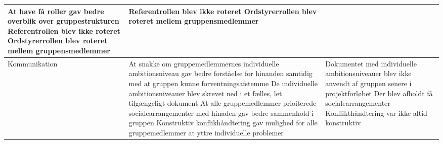 \begin{table}[h]
\begin{tabular}{|l|p{5cm}|p{5cm}||}
		       At have få roller gav bedre overblik over gruppestrukturen
		       Referentrollen blev ikke roteret                                                                                                                       \newline
			   Ordstyrerrollen blev roteret mellem gruppensmedlemmer                                                                                                  \newline
		                                                           &   Referentrollen blev ikke roteret                                                               \newline
		                                                           	   Ordstyrerrollen blev roteret mellem gruppensmedlemmer                                       \\ \hline
		\multicolumn{1}{|l|}{Kommunikation}                        &   
		       At snakke om gruppemedlemmernes individuelle ambitionsniveau gav bedre forståelse for hinanden samtidig med at gruppen kunne forventningsafstemme      \newline
		 	   De individuelle ambitionsniveauer blev skrevet ned i et fælles, let tilgængeligt dokument                                                              \newline
		 	   At alle gruppemedlemmer prioiterede socialearrangementer med hinaden gav bedre sammenhold i gruppen                                                    \newline
		 	   Konstruktiv konflikhåndtering gav mulighed for alle gruppemedlemmer at yttre individuelle problemer                                                    \newline
		 	                                                       &   Dokumentet med individuelle ambitionsniveauer blev ikke anvendt af gruppen senere i projektforløbet \newline
		                                                       	       Der blev afholdt få socialearrangementer                                                       \newline
		                                                       	       Konflikthåndtering var ikke altid konstruktiv                                               \\ \hline
	\end{tabular}
\end{table}